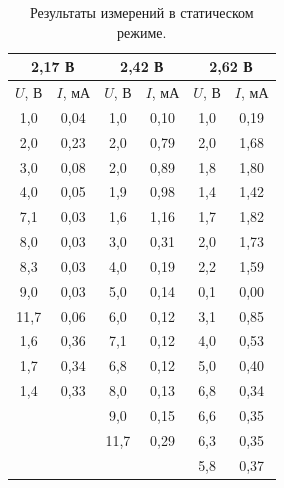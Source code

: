 \documentclass[a4paper,12pt]{article} %
\begin{document}
		\begin{table}[H]
			\caption{Результаты измерений в статическом режиме.}
			\label{table:exp2}
			\begin{tabular}{|c|c|c|c|c|c|}
				\hline
				\multicolumn{2}{|c|}{2,17 В} & \multicolumn{2}{c|}{2,42 В} & \multicolumn{2}{c|}{2,62 В} \\ \hline
				$U$, В        & $I$, мА       & $U$, В       & $I$, мА       & $U$, В       & $I$, мА       \\ \hline
				1,0           & 0,04          & 1,0          & 0,10          & 1,0          & 0,19          \\ \hline
				2,0           & 0,23          & 2,0          & 0,79          & 2,0          & 1,68          \\ \hline
				3,0           & 0,08          & 2,0          & 0,89          & 1,8          & 1,80          \\ \hline
				4,0           & 0,05          & 1,9          & 0,98          & 1,4          & 1,42          \\ \hline
				7,1           & 0,03          & 1,6          & 1,16          & 1,7          & 1,82          \\ \hline
				8,0           & 0,03          & 3,0          & 0,31          & 2,0          & 1,73          \\ \hline
				8,3           & 0,03          & 4,0          & 0,19          & 2,2          & 1,59          \\ \hline
				9,0           & 0,03          & 5,0          & 0,14          & 0,1          & 0,00          \\ \hline
				11,7          & 0,06          & 6,0          & 0,12          & 3,1          & 0,85          \\ \hline
				1,6           & 0,36          & 7,1          & 0,12          & 4,0          & 0,53          \\ \hline
				1,7           & 0,34          & 6,8          & 0,12          & 5,0          & 0,40          \\ \hline
				1,4           & 0,33          & 8,0          & 0,13          & 6,8          & 0,34          \\ \hline
				&               & 9,0          & 0,15          & 6,6          & 0,35          \\ \hline
				&               & 11,7         & 0,29          & 6,3          & 0,35          \\ \hline
				&               &              &               & 5,8          & 0,37          \\ \hline

\end{tabular}
\end{table}
\end{document}
